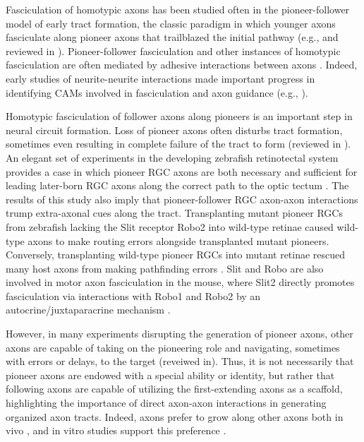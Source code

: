 \label{sec:HomotypicFascic}
Fasciculation of homotypic axons has been studied often in the pioneer-follower model of early tract formation, the classic paradigm in which younger axons fasciculate along pioneer axons that trailblazed the initial pathway (e.g.,  and reviewed in ).
Pioneer-follower fasciculation and other instances of homotypic fasciculation are often mediated by adhesive interactions between axons \cite{van1998adhesion}.
Indeed, early studies of neurite-neurite interactions made important progress in identifying CAMs involved in fasciculation and axon guidance (e.g., ).

Homotypic fasciculation of follower axons along pioneers is an important step in neural circuit formation.
Loss of pioneer axons often disturbs tract formation, sometimes even resulting in complete failure of the tract to form (reviewed in ).
An elegant set of experiments in the developing zebrafish retinotectal system provides a case in which pioneer RGC axons are both necessary and sufficient for leading later-born RGC axons along the correct path to the optic tectum \cite{pittman2008pathfinding}.
The results of this study also imply that pioneer-follower RGC axon-axon interactions trump extra-axonal cues along the tract.
Transplanting mutant pioneer RGCs from zebrafish lacking the Slit receptor Robo2 into wild-type retinae caused wild-type axons to make routing errors alongside transplanted mutant pioneers.
Conversely, transplanting wild-type pioneer RGCs into mutant retinae rescued many host axons from making pathfinding errors \cite{pittman2008pathfinding}.
Slit and Robo are also involved in motor axon fasciculation in the mouse, where Slit2 directly promotes fasciculation via interactions with Robo1 and Robo2 by an autocrine/juxtaparacrine mechanism \cite{jaworski2012autocrine}.

However, in many experiments disrupting the generation of pioneer axons, other axons are capable of taking on the pioneering role and navigating, sometimes with errors or delays, to the target (reveiwed in).
Thus, it is not necessarily that pioneer axons are endowed with a special ability or identity, but rather that following axons are capable of utilizing the first-extending axons as a scaffold, highlighting the importance of direct axon-axon interactions in generating organized axon tracts.
Indeed, axons prefer to grow along other axons both in vivo \cite{raper1983pathfinding,tosney1985development}, and in vitro studies support this preference \cite{bonhoeffer1985position}.

